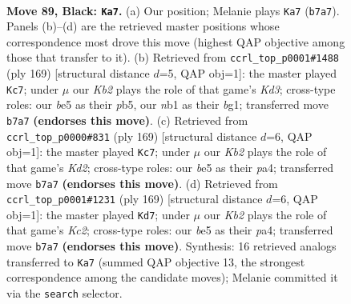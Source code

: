 \documentclass[11pt]{article}
\begin{document}
\clearpage

\begin{figure}[p]\centering
\begin{subfigure}{0.46\textwidth}\centering
\resizebox{\linewidth}{!}{%
\newchessgame
\chessboard[
  setfen={8/1k6/8/4B3/p1p3b1/8/5K2/1N6 b - - 33 89},
  showmover=false,
  pgfstyle=straightmove, color=movearrow, markmove={b7-a7}
]}
\caption{}
\end{subfigure}\hfill
\begin{subfigure}{0.46\textwidth}\centering
\resizebox{\linewidth}{!}{%
\newchessgame
\chessboard[
  setfen={8/8/3k4/1P5b/5p2/8/3K4/6B1 b - - 9 85},
  showmover=false,
  pgfstyle=straightmove, color=movearrow, markmove={d6-c7}
]}
\caption{}
\end{subfigure}
\\[4pt]
\begin{subfigure}{0.46\textwidth}\centering
\resizebox{\linewidth}{!}{%
\newchessgame
\chessboard[
  setfen={8/3k4/8/p1K5/P7/8/2N1p3/8 b - - 37 85},
  showmover=false,
  pgfstyle=straightmove, color=movearrow, markmove={d7-c7}
]}
\caption{}
\end{subfigure}\hfill
\begin{subfigure}{0.46\textwidth}\centering
\resizebox{\linewidth}{!}{%
\newchessgame
\chessboard[
  setfen={8/2k5/8/p7/P7/3N4/K3p3/8 b - - 15 85},
  showmover=false,
  pgfstyle=straightmove, color=movearrow, markmove={c7-d7}
]}
\caption{}
\end{subfigure}
\caption{\textbf{Move 89, Black: \texttt{Ka7}.} (a) Our position; Melanie plays \texttt{Ka7} (\texttt{b7a7}). Panels (b)--(d) are the retrieved master positions whose correspondence most drove this move (highest QAP objective among those that transfer to it). (b) Retrieved from \texttt{ccrl\_top\_p0001\#1488} (ply 169) [structural distance $d$=5, QAP obj=1]: the master played \texttt{Kc7}; under $\mu$ our \emph{Kb2} plays the role of that game's \emph{Kd3}; cross-type roles: our \emph{b}e5 as their \emph{p}b5, our \emph{n}b1 as their \emph{b}g1; transferred move \texttt{b7a7} \textbf{(endorses this move)}. (c) Retrieved from \texttt{ccrl\_top\_p0000\#831} (ply 169) [structural distance $d$=6, QAP obj=1]: the master played \texttt{Kc7}; under $\mu$ our \emph{Kb2} plays the role of that game's \emph{Kd2}; cross-type roles: our \emph{b}e5 as their \emph{p}a4; transferred move \texttt{b7a7} \textbf{(endorses this move)}. (d) Retrieved from \texttt{ccrl\_top\_p0001\#1231} (ply 169) [structural distance $d$=6, QAP obj=1]: the master played \texttt{Kd7}; under $\mu$ our \emph{Kb2} plays the role of that game's \emph{Kc2}; cross-type roles: our \emph{b}e5 as their \emph{p}a4; transferred move \texttt{b7a7} \textbf{(endorses this move)}. Synthesis: 16 retrieved analogs transferred to \texttt{Ka7} (summed QAP objective 13, the strongest correspondence among the candidate moves); Melanie committed it via the \texttt{search} selector.}
\label{fig:thought-m177}
\end{figure}
\end{document}
